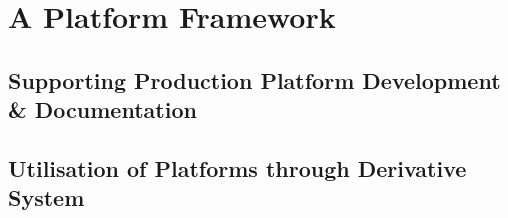 \chapter{A Platform Framework}\label{chp:pltfFramework}

\section{Supporting Production Platform Development \& Documentation}

\section{Utilisation of Platforms through Derivative System}